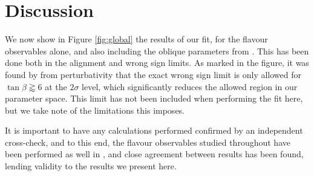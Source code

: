 \documentclass[a4paper,12pt]{article}
\begin{document}
\section{Discussion}
\label{sec:discuss}
We now show in Figure \ref{fig:global} the results of our fit, for the flavour observables alone, and also including the oblique parameters from \cite{james}.
This has been done both in the alignment and wrong sign limits. 
As marked in the figure, it was found by \cite{oliver} from perturbativity that the exact wrong sign limit is only allowed for $\tan\beta\gtrapprox6$ at the $2\sigma$ level, which significantly reduces the allowed region in our parameter space. 
This limit has not been included when performing the fit here, but we take note of the limitations this imposes.

It is important to have any calculations performed confirmed by an independent cross-check, and to this end, the flavour observables studied throughout have been performed as well in \cite{tom}, and close agreement between results has been found, lending validity to the results we present here. 
\end{document}
